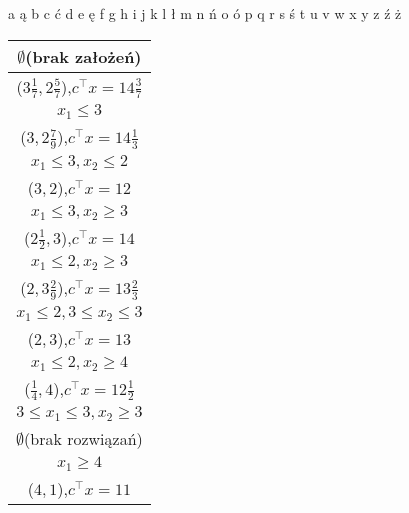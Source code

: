 a\newline
ą\newline
b\newline
c\newline
ć\newline
d\newline
e\newline
ę\newline
f\newline
g\newline
h\newline
i\newline
j\newline
k\newline
l\newline
ł\newline
m\newline
n\newline
ń\newline
o\newline
ó\newline
p\newline
q\newline
r\newline
s\newline
ś\newline
t\newline
u\newline
v\newline
w\newline
x\newline
y\newline
z\newline
ź\newline
ż\newline
{\Large
\begin{tabular}{|c|}\hline

$\emptyset$(brak założeń)\\\hline($3\frac{1}{7},2\frac{5}{7}$),$c^{\top}x=14\frac{3}{7}$ \\\hline\hline
$x_1\le 3$\\\hline($3,2\frac{7}{9}$),$c^{\top}x=14\frac{1}{3}$ \\\hline\hline
$x_1\le 3,x_2\le 2$\\\hline($3,2$),$c^{\top}x=12$ \\\hline\hline
$x_1\le 3,x_2\ge 3$\\\hline($2\frac{1}{2},3$),$c^{\top}x=14$ \\\hline\hline
$x_1\le 2,x_2\ge 3$\\\hline($2,3\frac{2}{9}$),$c^{\top}x=13\frac{2}{3}$  \\\hline\hline
$x_1\le 2,3\le x_2\le 3$\\\hline($2,3$),$c^{\top}x=13$  \\\hline\hline
$x_1\le 2,x_2\ge 4$\\\hline($\frac{1}{4},4$),$c^{\top}x=12\frac{1}{2}$  \\\hline\hline
$3\le x_1\le 3,x_2\ge 3$\\\hline$\emptyset$(brak rozwiązań) \\\hline\hline
$x_1\ge 4$\\\hline($4,1$),$c^{\top}x=11$  \\\hline\hline
\end{tabular}
}
